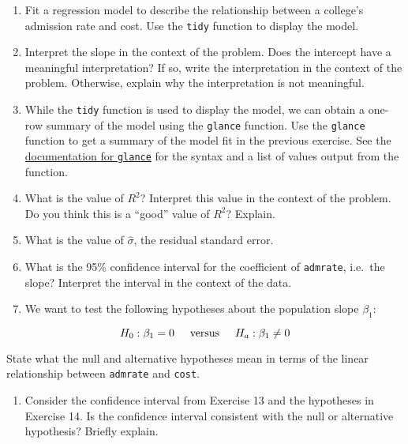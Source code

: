 \documentclass[]{book}
\providecommand{\tightlist}{%
  \setlength{\itemsep}{0pt}\setlength{\parskip}{0pt}}
\begin{document}
\begin{enumerate}
\def\labelenumi{\arabic{enumi}.}
\setcounter{enumi}{7}
\item
  Fit a regression model to describe the relationship between a
  college's admission rate and cost. Use the \texttt{tidy} function to
  display the model.
\item
  Interpret the slope in the context of the problem. Does the intercept
  have a meaningful interpretation? If so, write the interpretation in
  the context of the problem. Otherwise, explain why the interpretation
  is not meaningful.
\item
  While the \texttt{tidy} function is used to display the model, we can
  obtain a one-row summary of the model using the \texttt{glance}
  function. Use the \texttt{glance} function to get a summary of the
  model fit in the previous exercise. See the
  \href{https://rdrr.io/cran/broom/man/glance.lm.html}{documentation for
  \texttt{glance}} for the syntax and a list of values output from the
  function.
\item
  What is the value of \(R^2\)? Interpret this value in the context of
  the problem. Do you think this is a ``good'' value of \(R^2\)?
  Explain.
\item
  What is the value of \(\hat{\sigma}\), the residual standard error.
\item
  What is the 95\% confidence interval for the coefficient of
  \texttt{admrate}, i.e.~the slope? Interpret the interval in the
  context of the data.
\item
  We want to test the following hypotheses about the population slope
  \(\beta_1\):
\end{enumerate}

\[H_0: \beta_1 = 0 \hspace{5mm} \text{versus} \hspace{5mm} H_a: \beta_1 \neq 0\]

State what the null and alternative hypotheses mean in terms of the
linear relationship between \texttt{admrate} and \texttt{cost}.

\begin{enumerate}
\def\labelenumi{\arabic{enumi}.}
\setcounter{enumi}{14}
\tightlist
\item
  Consider the confidence interval from Exercise 13 and the hypotheses
  in Exercise 14. Is the confidence interval consistent with the null or
  alternative hypothesis? Briefly explain.
\end{enumerate}
\end{document}
